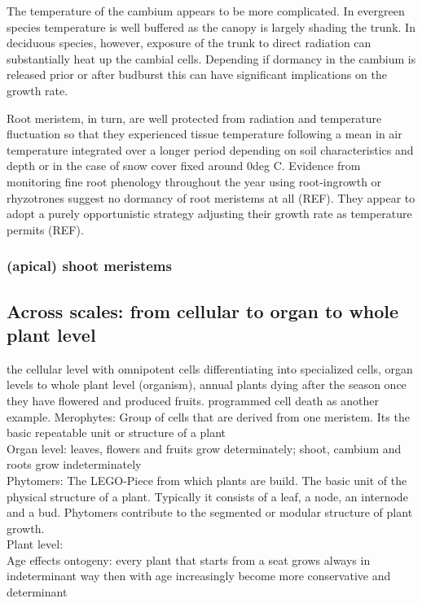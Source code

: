 \documentclass{article}
\begin{document}
		The temperature of the cambium appears to be more complicated. In evergreen species temperature is well buffered as the canopy is largely shading the trunk. In deciduous species, however, exposure of the trunk to direct radiation can substantially heat up the cambial cells. Depending if dormancy in the cambium is released prior or after budburst this can have significant implications on the growth rate. 
		
		Root meristem, in turn, are well protected from radiation and temperature fluctuation so that they experienced tissue temperature following a mean in air temperature integrated over a longer period depending on soil characteristics and depth or in the case of snow cover fixed around 0deg C. Evidence from monitoring fine root phenology throughout the year using root-ingrowth or rhyzotrones suggest no dormancy of root meristems at all (REF). They appear to adopt a purely opportunistic strategy adjusting their growth rate as temperature permits (REF).
		
		
		
		
		
	
	\subsubsection{(apical) shoot meristems}
	
	\subsection*{Across scales: from cellular to organ to whole plant level}
	the cellular level with omnipotent cells differentiating into specialized cells, organ levels to whole plant level (organism), annual plants dying after the season once they have flowered and produced fruits. programmed cell death as another example.
	Merophytes: Group of cells that are derived from one meristem. Its the basic repeatable unit or structure of a plant\\
	Organ level: leaves, flowers and fruits grow determinately; shoot, cambium and roots grow indeterminately\\
	Phytomers: The LEGO-Piece from which plants are build. The basic unit of the physical structure of a plant. Typically it consists of a leaf, a node, an internode and a bud. Phytomers contribute to the segmented or modular structure of plant growth. \\
	Plant level:\\
	Age effects ontogeny: every plant that starts from a seat grows always in indeterminant way then with age increasingly become more conservative and determinant\\
	
\end{document}
